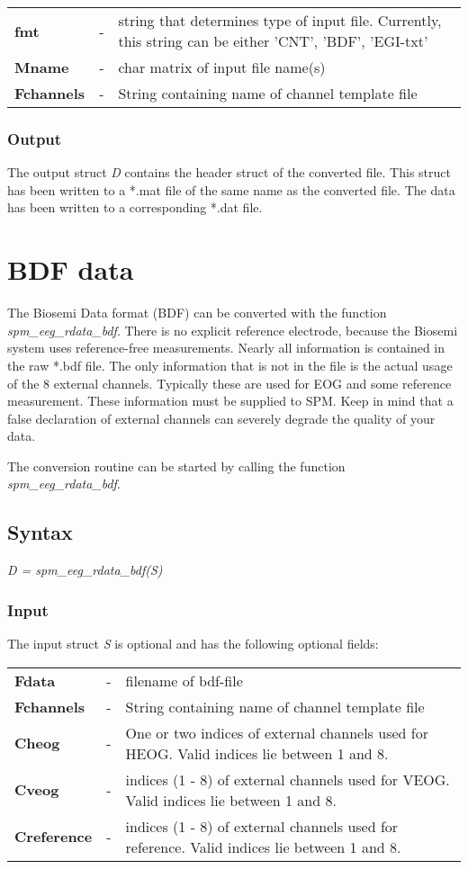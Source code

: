 \begin{tabular}{lcp{9cm}}
{\bf fmt} & - & string that determines type of input file. Currently,
this string can be either 'CNT', 'BDF', 'EGI-txt'\\
{\bf Mname} & - & char matrix of input file name(s)\\
{\bf Fchannels} & - & String containing name of channel template file 
\end{tabular}

\subsubsection{Output}
The output struct {\it D} contains the header struct of the converted
file. This struct has been written to a *.mat file of the same name as
the converted file. The data has been written to a corresponding *.dat
file.

\section{BDF data}
The Biosemi Data format (BDF) can be converted with the function {\it
spm\_eeg\_rdata\_bdf}. There is no explicit reference electrode,
because the Biosemi system uses reference-free measurements. Nearly
all information is contained in the raw *.bdf file. The only
information that is not in the file is the actual usage of the 8
external channels. Typically these are used for EOG and some reference 
measurement. These information must be supplied to SPM. Keep in mind
that a false declaration of external channels can severely degrade
the quality of your data.

The conversion routine can be started by calling the function
\textit{spm\_eeg\_rdata\_bdf}. 

\subsection{Syntax}
\textit{D = spm\_eeg\_rdata\_bdf(S)}
\\

\subsubsection{Input}
The input struct {\it S} is optional and has the following optional fields:

\begin{tabular}{lcp{9cm}}
{\bf Fdata} & - & filename of bdf-file\\
{\bf Fchannels} & - & String containing name of channel template
file\\
{\bf Cheog} & - & One or two indices of external channels used for
HEOG. Valid indices lie between 1 and 8.\\
{\bf Cveog} & - & indices (1 - 8) of external channels used for
VEOG. Valid indices lie between 1 and 8.\\
{\bf Creference} & - & indices (1 - 8) of external channels used for
reference. Valid indices lie between 1 and 8.
\end{tabular}

